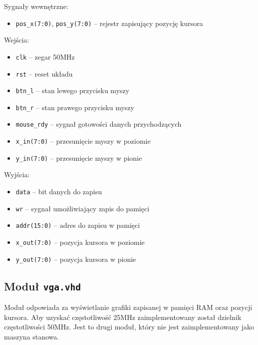 Sygnały wewnętrzne:
\begin{itemize}
  \item \texttt{pos\_x(7:0)}, \texttt{pos\_y(7:0)} -- rejestr zapisujący pozycję kursora
\end{itemize}
\vspace{1em}
Wejścia:
\begin{itemize}
  \item \texttt{clk} -- zegar 50MHz
  \item \texttt{rst} -- reset układu
  \item \texttt{btn\_l} -- stan lewego przycisku myszy
  \item \texttt{btn\_r} -- stan prawego przycisku myszy
  \item \texttt{mouse\_rdy} -- sygnał gotowości danych przychodzących
  \item \texttt{x\_in(7:0)} -- przesunięcie myszy w poziomie
  \item \texttt{y\_in(7:0)} -- przesunięcie myszy w pionie
\end{itemize}
\vspace{1em}
Wyjścia:
\begin{itemize}
  \item \texttt{data} -- bit danych do zapisu
  \item \texttt{wr} -- sygnał umożliwiający zapis do pamięci
  \item \texttt{addr(15:0)} -- adres do zapisu w pamięci
  \item \texttt{x\_out(7:0)} -- pozycja kursora w poziomie
  \item \texttt{y\_out(7:0)} -- pozycja kursora w pionie
\end{itemize}

\subsection{Moduł \texttt{vga.vhd}}
Moduł odpowiada za wyświetlanie grafiki zapisanej w pamięci RAM oraz pozycji
kursora. Aby uzyskać częstotliwość 25MHz zaimplementowany został dzielnik
częstotliwości 50MHz.
Jest to drugi moduł, który nie jest zaimplementowany jako maszyna stanowa.
\vspace{1em}

